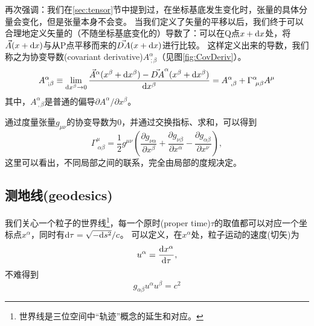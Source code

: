 再次强调：我们在\ref{sec:tensor}节中提到过，在坐标基底发生变化时，张量的具体分量会变化，但是张量本身不会变。
当我们定义了矢量的平移以后，我们终于可以合理地定义矢量的（不随坐标基底变化的）导数了：可以在Q点$x+{\rm d}x$处，将$\vec{A}(x+{\rm d}x)$与从P点平移而来的$\vec{DA}(x+{\rm d}x)$进行比较。
这样定义出来的导数，我们称之为协变导数(covariant derivative)$A^\alpha_{~; \beta}$（见图\ref{fig:CovDeriv}）。
\begin{equation}\label{eq:CovDeriv}
A^\alpha_{~; \beta} \equiv \lim_{{\rm d}x^\beta \to 0}\frac{\vec{A}^\alpha(x^\beta+{\rm d}x^\beta)-\vec{DA}^\alpha(x^\beta+{\rm d}x^\beta)}{{\rm d}x^\beta} =A^\alpha_{~, \beta} + \Gamma^\alpha_{~\mu\beta}A^\mu
\end{equation}
其中，$A^\alpha_{~, \beta}$是普通的偏导$\partial A^\alpha/\partial x^\beta$。

通过度量张量$g_{\mu\nu}$的协变导数为0，并通过交换指标、求和，可以得到
\begin{equation}\label{eq:ChristoffelDef}
\Gamma ^{\mu}_{{~\alpha\beta}}={\frac  {1}{2}}g^{{\mu\nu}}\left({\frac  {\partial g_{{\nu\alpha}}}{\partial x^{\beta}}}+{\frac  {\partial g_{{\nu\beta}}}{\partial x^{\alpha}}}-{\frac  {\partial g_{{\alpha\beta}}}{\partial x^{\nu}}}\right),
\end{equation}
这里可以看出，不同局部之间的联系，完全由局部的度规决定。

\subsection{测地线(geodesics)}
我们关心一个粒子的世界线\footnote{世界线是三位空间中“轨迹”概念的延生和对应。}，每一个原时(proper time)$\tau$的取值都可以对应一个坐标点$x^\alpha$，同时有${\rm d}\tau = \sqrt{-{\rm d}s^2}/c$。
可以定义，在$x^\alpha$处，粒子运动的速度(切矢)为
\begin{equation}\label{eq:velocity}
  u^\alpha = \frac{{\rm d}x^\alpha}{{\rm d}\tau},
\end{equation}
不难得到
\begin{equation}\label{eq:gmunuNorm}
  g_{\alpha \beta}u^\alpha u^\beta = c^2  
\end{equation}

